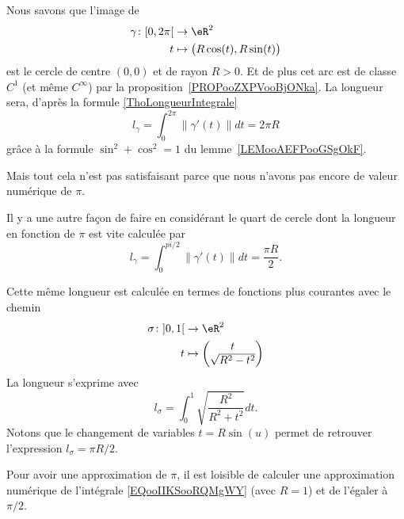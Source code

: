 \begin{example}
    Nous savons que l'image de
    \begin{equation}
        \begin{aligned}
            \gamma\colon \mathopen[ 0 , 2\pi \mathclose[&\to \eR^2 \\
            t&\mapsto \big( R\cos(t),R\sin(t) \big)
        \end{aligned}
    \end{equation}
    est le cercle de centre \( (0,0)\) et de rayon \( R>0\). Et de plus cet arc est de classe \( C^1\) (et même \(  C^{\infty}\)) par la proposition~\ref{PROPooZXPVooBjONka}. La longueur sera, d'après la formule \eqref{ThoLongueurIntegrale}
    \begin{equation}
        l_{\gamma}=\int_0^{2\pi}\| \gamma'(t) \|dt=2\pi R
    \end{equation}
    grâce à la formule \( \sin^2+\cos^2=1\) du lemme~\ref{LEMooAEFPooGSgOkF}.

    Mais tout cela n'est pas satisfaisant parce que nous n'avons pas encore de valeur numérique de \( \pi\).

    Il y a une autre façon de faire en considérant le quart de cercle dont la longueur en fonction de \( \pi\) est vite calculée par
    \begin{equation}
        l_{\gamma}=\int_0^{pi/2}\| \gamma'(t) \|dt=\frac{ \pi R }{ 2 }.
    \end{equation}

    Cette même longueur est calculée en termes de fonctions plus courantes avec le chemin
    \begin{equation}
        \begin{aligned}
        \sigma\colon \mathopen] 0 , 1 \mathclose[&\to \eR^2 \\
            t&\mapsto \begin{pmatrix}
                t    \\
                \sqrt{ R^2-t^2 }
            \end{pmatrix}
        \end{aligned}
    \end{equation}
    La longueur s'exprime avec
    \begin{equation}        \label{EQooIIKSooRQMgWY}
        l_{\sigma}=\int_0^1\sqrt{ \frac{ R^2 }{ R^2+t^2 } }dt.
    \end{equation}
    Notons que le changement de variables \( t=R\sin(u)\) permet de retrouver l'expression \( l_{\sigma}=\pi R/2\).

    Pour avoir une approximation de \( \pi\), il est loisible de calculer une approximation numérique de l'intégrale \eqref{EQooIIKSooRQMgWY} (avec \( R=1\)) et de l'égaler à \( \pi/2\).
\end{example}


